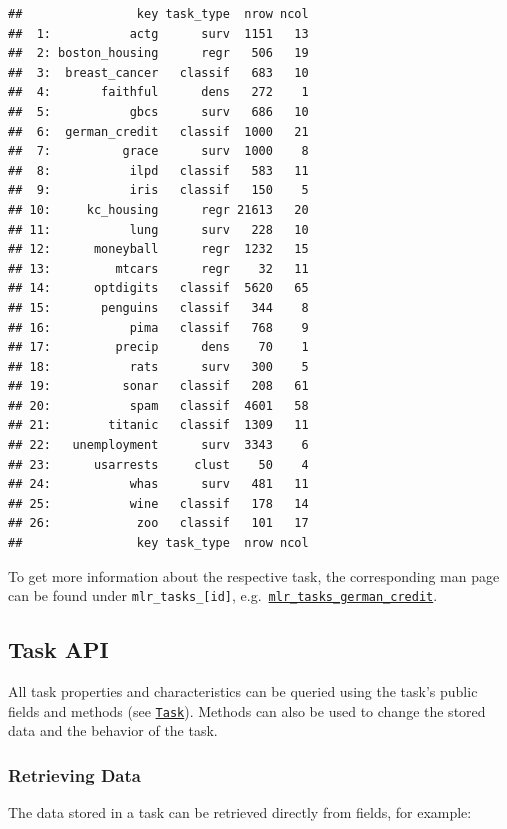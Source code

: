 \documentclass[
]{scrbook}
\begin{document}
\begin{verbatim}
##                key task_type  nrow ncol
##  1:           actg      surv  1151   13
##  2: boston_housing      regr   506   19
##  3:  breast_cancer   classif   683   10
##  4:       faithful      dens   272    1
##  5:           gbcs      surv   686   10
##  6:  german_credit   classif  1000   21
##  7:          grace      surv  1000    8
##  8:           ilpd   classif   583   11
##  9:           iris   classif   150    5
## 10:     kc_housing      regr 21613   20
## 11:           lung      surv   228   10
## 12:      moneyball      regr  1232   15
## 13:         mtcars      regr    32   11
## 14:      optdigits   classif  5620   65
## 15:       penguins   classif   344    8
## 16:           pima   classif   768    9
## 17:         precip      dens    70    1
## 18:           rats      surv   300    5
## 19:          sonar   classif   208   61
## 20:           spam   classif  4601   58
## 21:        titanic   classif  1309   11
## 22:   unemployment      surv  3343    6
## 23:      usarrests     clust    50    4
## 24:           whas      surv   481   11
## 25:           wine   classif   178   14
## 26:            zoo   classif   101   17
##                key task_type  nrow ncol
\end{verbatim}

To get more information about the respective task, the corresponding man page can be found under \texttt{mlr\_tasks\_{[}id{]}}, e.g.~\href{https://mlr3.mlr-org.com/reference/mlr_tasks_german_credit.html}{\texttt{mlr\_tasks\_german\_credit}}.

\hypertarget{tasks-api}{%
\subsection{Task API}\label{tasks-api}}

All task properties and characteristics can be queried using the task's public fields and methods (see \href{https://mlr3.mlr-org.com/reference/Task.html}{\texttt{Task}}).
Methods can also be used to change the stored data and the behavior of the task.

\hypertarget{tasks-retrieving}{%
\subsubsection{Retrieving Data}\label{tasks-retrieving}}

The data stored in a task can be retrieved directly from fields, for example:
\end{document}
